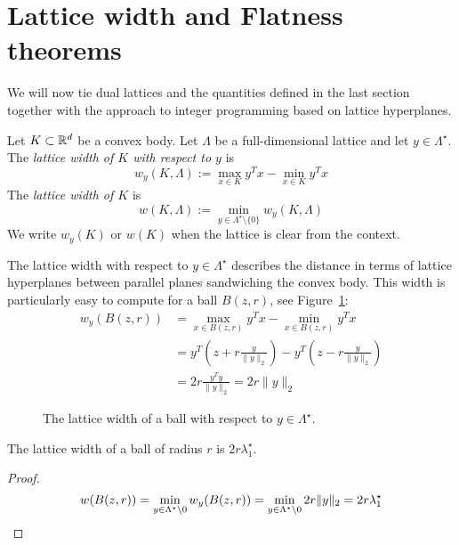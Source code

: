\section{Lattice width and Flatness theorems}

We will now tie dual lattices and the quantities defined in the last section
together with the approach to integer programming based on lattice hyperplanes.

\begin{definition}
  Let $K \subset \mathbb{R}^d$ be a convex body.
  Let $\Lambda$ be a full-dimensional lattice and let $y \in \Lambda^\star$.
  The \emph{lattice width of $K$ with respect to $y$} is
  \[
    w_y(K, \Lambda) := \max_{x \in K} y^T x - \min_{x \in K} y^T x
  \]
  The \emph{lattice width of $K$} is
  \[
    w(K, \Lambda) := \min_{y \in \Lambda^\star \setminus \{0\} } w_y(K,\Lambda)
  \]
  We write $w_y(K)$ or $w(K)$ when the lattice is clear from the context.
\end{definition}

The lattice width with respect to $y \in \Lambda^\star$
describes the distance in terms of lattice hyperplanes between parallel planes
sandwiching the convex body.
This width is particularly easy to compute for a ball $B(z,r)$,
see Figure~\ref{fig:lattice-width-ball}:
\begin{align*}
  w_y(B(z,r)) &= \max_{x \in B(z,r)} y^Tx - \min_{x \in B(z,r)} y^Tx \\
   &= y^T (z + r \frac{y}{\|y\|_2}) - y^T (z - r \frac{y}{\|y\|_2}) \\
   &= 2r \frac{y^T y}{\|y\|_2} = 2r \|y\|_2
\end{align*}
\begin{figure}
  \begin{center}
  \end{center}
  \caption{The lattice width of a ball with respect to $y \in \Lambda^\star$.}
  \label{fig:lattice-width-ball}
\end{figure}

\begin{lemma}
  The lattice width of a ball of radius $r$ is $2r\lambda_1^\star$.
\end{lemma}
\begin{proof}
  \[
    w(B(z,r)) = \min_{y \in \Lambda^\star \setminus 0} w_y(B(z,r))
      = \min_{y \in \Lambda^\star \setminus 0} 2r \|y\|_2 = 2r \lambda_1^\star
    \qedhere
  \]
\end{proof}

